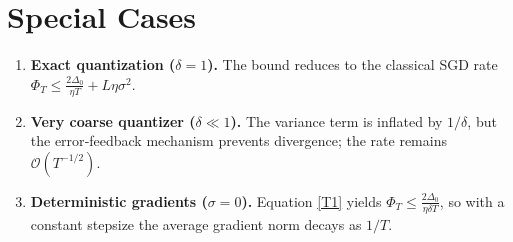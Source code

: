 \documentclass{article}
\begin{document}
\section*{Special Cases}
\begin{enumerate}[label=\alph*.]
\item \textbf{Exact quantization ($\delta=1$).}
The bound reduces to the classical SGD rate
$\Phi_T\le \frac{2\Delta_0}{\eta T}+L\eta\sigma^{2}$.

\item \textbf{Very coarse quantizer ($\delta\ll1$).}
The variance term is inflated by $1/\delta$, but the error‑feedback
mechanism prevents divergence; the rate remains $\mathcal O(T^{-1/2})$.

\item \textbf{Deterministic gradients ($\sigma=0$).}
Equation \eqref{T1} yields $\Phi_T\le \frac{2\Delta_0}{\eta\delta T}$,
so with a constant stepsize the average gradient norm decays as $1/T$.

\end{enumerate}
\end{document}
